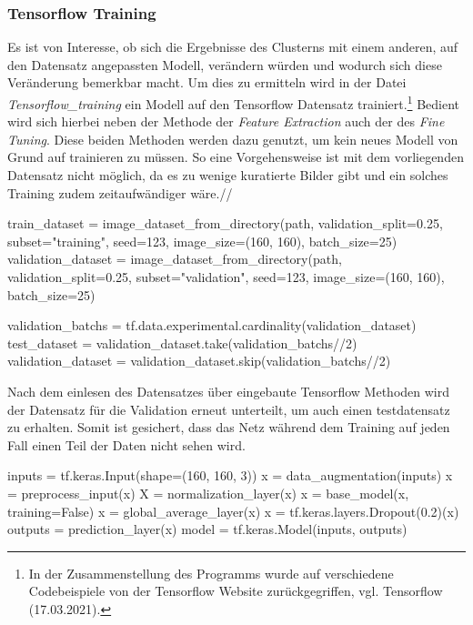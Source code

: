 \documentclass[a4paper,12pt,ngerman]{article}
\begin{document}
\subsubsection{Tensorflow Training}

Es ist von Interesse, ob sich die Ergebnisse des Clusterns mit einem anderen, auf den Datensatz angepassten Modell, verändern würden und wodurch sich diese Veränderung bemerkbar macht. Um dies zu ermitteln wird in der Datei \textit{Tensorflow\_training} ein Modell auf den Tensorflow Datensatz trainiert.\footnote{In der Zusammenstellung des Programms wurde auf verschiedene Codebeispiele von der Tensorflow Website zurückgegriffen, vgl. Tensorflow (17.03.2021).} Bedient wird sich hierbei neben der Methode der \textit{Feature Extraction} auch der des \textit{Fine Tuning}. Diese beiden Methoden werden dazu genutzt, um kein neues Modell von Grund auf trainieren zu müssen. So eine Vorgehensweise ist mit dem vorliegenden Datensatz nicht möglich, da es zu wenige kuratierte Bilder gibt und ein solches Training zudem zeitaufwändiger wäre.//

\begin{python}
	train_dataset = image_dataset_from_directory(path, validation_split=0.25, subset="training", seed=123, image_size=(160, 160), batch_size=25)
	validation_dataset = image_dataset_from_directory(path, validation_split=0.25, subset="validation", seed=123, image_size=(160, 160), batch_size=25)

	validation_batchs = tf.data.experimental.cardinality(validation_dataset)
	test_dataset = validation_dataset.take(validation_batchs//2)
	validation_dataset = validation_dataset.skip(validation_batchs//2)
\end{python}

Nach dem einlesen des Datensatzes über eingebaute Tensorflow Methoden wird der Datensatz für die Validation erneut unterteilt, um auch einen testdatensatz zu erhalten. Somit ist gesichert, dass das Netz während dem Training auf jeden Fall einen Teil der Daten nicht sehen wird. \\

\begin{python}
	inputs = tf.keras.Input(shape=(160, 160, 3))
	x = data_augmentation(inputs)
	x = preprocess_input(x)
	X = normalization_layer(x)
	x = base_model(x, training=False)
	x = global_average_layer(x)
	x = tf.keras.layers.Dropout(0.2)(x)
	outputs = prediction_layer(x)
	model = tf.keras.Model(inputs, outputs)
\end{python}
\end{document}
